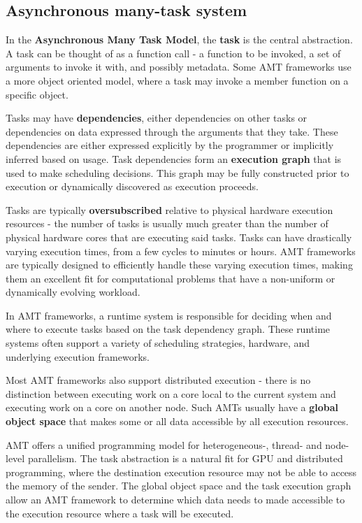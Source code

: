 \documentclass[12pt,letterpaper]{article}
\begin{document}
\subsection{Asynchronous many-task system}
\label{sec:amt}
In the \textbf{Asynchronous Many Task Model}, the \textbf{task} is the central abstraction.
A task can be thought of as a function call - a function to be invoked, a set
  of arguments to invoke it with, and possibly metadata.
Some AMT frameworks use a more object oriented model, where a task may invoke
  a member function on a specific object.

Tasks may have \textbf{dependencies}, either dependencies on other tasks or
  dependencies on data expressed through the arguments that they take.
These dependencies are either expressed explicitly by the programmer or
  implicitly inferred based on usage.
Task dependencies form an \textbf{execution graph} that is used to make scheduling
  decisions.
This graph may be fully constructed prior to execution or dynamically
  discovered as execution proceeds.

Tasks are typically \textbf{oversubscribed} relative to physical hardware execution
  resources - the number of tasks is usually much greater than the number of
  physical hardware cores that are executing said tasks.
Tasks can have drastically varying execution times, from a few cycles to minutes or hours.
AMT frameworks are typically designed to efficiently handle these varying
  execution times, making them an excellent fit for computational problems that
  have a non-uniform or dynamically evolving workload.

In AMT frameworks, a runtime system is responsible for deciding when and where
  to execute tasks based on the task dependency graph.
These runtime systems often support a variety of scheduling strategies,
  hardware, and underlying execution frameworks.

Most AMT frameworks also support distributed execution - there is no distinction
  between executing work on a core local to the current system and executing
  work on a core on another node.
Such AMTs usually have a \textbf{global object space} that makes some or all data accessible by all execution resources.

AMT offers a unified programming model for heterogeneous-, thread- and
  node-level parallelism.
The task abstraction is a natural fit for GPU and distributed programming, where
  the destination execution resource may not be able to access the memory of
  the sender.
The global object space and the task execution graph allow an AMT framework to
  determine which data needs to made accessible to the execution resource where
  a task will be executed.
\end{document}

